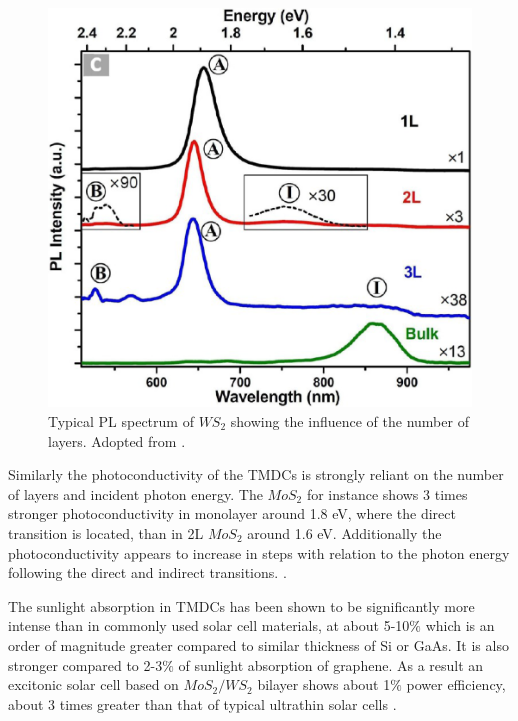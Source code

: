 \begin{figure}[ht]
	\begin{center}
		\includegraphics[scale=0.3]{WS2TypicalPLSpectra.png}
		\caption{Typical PL spectrum of $WS_2$ showing the influence of the number of layers. Adopted from \cite{ExtraordinaryRoomTemperaturePhotoluminescenceInTriangularWS2Monolayers}.}
		\label{fig:WS2TypicalPLSpectra}
	\end{center}
\end{figure}
		
Similarly the photoconductivity of the TMDCs is strongly reliant on the number of layers and incident photon energy. The $MoS_2$ for instance shows 3 times stronger photoconductivity in monolayer around 1.8 eV, where the direct transition is located, than in 2L $MoS_2$ around 1.6 eV. Additionally the photoconductivity appears to increase in steps with relation to the photon energy following the direct and indirect transitions. \cite{ElectronicsAndOptoelectronicsOfTwo-dimensionalTransitionMetalDichalcogenides}.
		
The sunlight absorption in TMDCs has been shown to be significantly more intense than in commonly used solar cell materials, at about 5-10$\%$ which is an order of magnitude greater compared to similar thickness of Si or GaAs. It is also stronger compared to 2-3$\%$ of sunlight absorption of graphene. As a result an excitonic solar cell based on $MoS_2/WS_2$ bilayer shows about 1$\%$ power efficiency, about 3 times greater than that of typical ultrathin solar cells \cite{ExtraordinarySunlightAbsorptionAndOneNanometerThickPhotovoltaicsUsingTwo-DimensionalMonolayerMaterials}.
	
